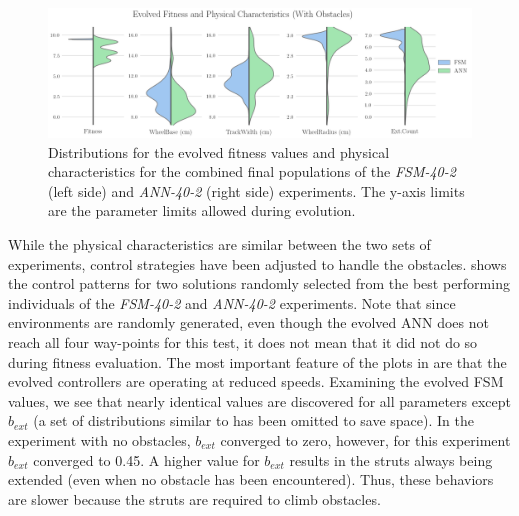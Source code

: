 \begin{figure}[!ht]
    \centering

    \includegraphics[width=\columnwidth]{figures/4-results/40-2-best_params.png}


    \caption{Distributions for the evolved fitness values and physical characteristics for the combined final populations of the \emph{FSM-40-2} (left side) and \emph{ANN-40-2} (right side) experiments. The y-axis limits are the parameter limits allowed during evolution.}
    \label{fig:40-2-best-params}


\end{figure}



While the physical characteristics are similar between the two sets of experiments, control strategies have been adjusted to handle the obstacles.
%
 shows the control patterns for two solutions randomly selected from the best performing individuals of the \emph{FSM-40-2} and \emph{ANN-40-2} experiments.
%
Note that since environments are randomly generated, even though the evolved ANN does not reach all four way-points for this test, it does not mean that it did not do so during fitness evaluation.
%
The most important feature of the plots in  are that the evolved controllers are operating at reduced speeds.
%
%
Examining the evolved FSM values, we see that nearly identical values are discovered for all parameters except $b_{\mathit{ext}}$
(a set of distributions similar to  has been omitted to save space).
%
In the experiment with no obstacles, $b_{\mathit{ext}}$ converged to zero, however, for this experiment $b_{\mathit{ext}}$ converged to 0.45.
%
A higher value for $b_{\mathit{ext}}$ results in the struts always being extended (even when no obstacle has been encountered).
%
Thus, these behaviors are slower because the struts are required to climb obstacles.

